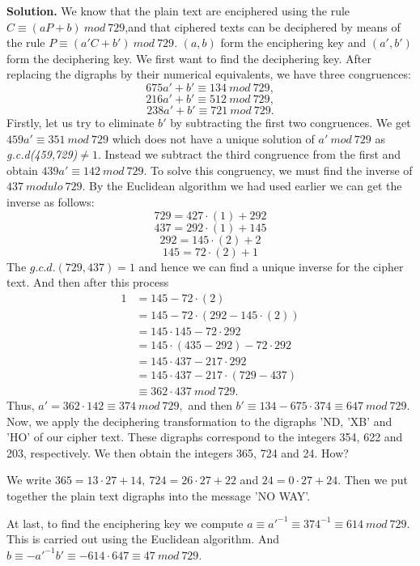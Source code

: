 \documentclass[12pt]{article}
\begin{document}
\textbf{Solution.} We know that the plain text are enciphered using the rule $C \equiv (aP + b) \: mod \: 729$,and that ciphered texts can be deciphered by means of the rule $P \equiv (a'C + b') \: mod \: 729$. $(a,b)$ form the enciphering key and $(a',b')$ form the deciphering key. We first want to find the deciphering key. After replacing the digraphs by their numerical equivalents, we have three congruences:
$$675a'+b' \equiv 134 \: mod \: 729,$$
$$216a'+b' \equiv 512 \: mod \: 729,$$
$$238a'+b' \equiv 721 \: mod \: 729.$$
Firstly, let us try to eliminate $b'$ by subtracting the first two congruences. We get $459a' \equiv 351 \: mod \: 729$ which does not have a unique solution of $a' \: mod \: 729$ as \textit{g.c.d(459,729)}$\ne 1$. Instead we subtract the third congruence from the first and obtain $439a' \equiv 142 \: mod \: 729$. To solve this congruency, we must find the inverse of $437 \: modulo \: 729$. By the Euclidean algorithm we had used earlier we can get the inverse as follows:
$$729=427 \cdot (1)+292$$
$$437=292 \cdot (1)+ 145$$
$$292= 145 \cdot (2)+ 2$$
$$145=72\cdot(2)+1$$
The $g.c.d.(729,437)=1$ and hence we can find a unique inverse for the cipher text. And then after this process
\begin{equation}
\begin{split}
1 & = 145-72 \cdot (2) \\
  & = 145 -72 \cdot (292-145 \cdot (2)) \\
  & = 145 \cdot 145 - 72 \cdot 292 \\
  & = 145 \cdot (435-292)- 72 \cdot 292 \\
  & = 145 \cdot 437 -217 \cdot 292 \\
  & = 145 \cdot 437 -217 \cdot (729 -437) \\
  & \equiv 362 \cdot 437 \: mod \: 729.
\end{split}
\end{equation}
Thus, $a'=362 \cdot 142 \equiv 374 \: mod \: 729,$ and then $b' \equiv 134-675 \cdot 374 \equiv 647 \: mod \: 729.$ Now, we apply the deciphering transformation to the digraphs 'ND, 'XB' and 'HO' of our cipher text. These digraphs correspond to the integers 354, 622 and 203, respectively. We then obtain the integers 365, 724 and 24. How?

We write $365=13 \cdot 27 +14, \: 724=26 \cdot 27+22 $ and $ 24=0 \cdot 27+24.$ Then we put together the plain text digraphs into the message 'NO WAY'.

At last, to find the enciphering key we compute $a \equiv a'^{-1} \equiv 374^{-1} \equiv 614 \: mod \: 729.$ This is carried out using the Euclidean algorithm. And $b \equiv -a'^{-1}b' \equiv -614    \cdot 647 \equiv 47 \: mod \: 729$.
\end{document}
